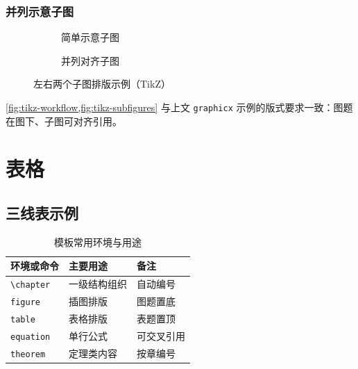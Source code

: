 \subsection{并列示意子图}
\begin{figure}[htbp]
  \centering
  \begin{subfigure}[b]{0.47\textwidth}
    \centering
    \caption{简单示意子图}
    \label{fig:tikz-sub-left}
  \end{subfigure}
  \hfill
  \begin{subfigure}[b]{0.47\textwidth}
    \centering
    \caption{并列对齐子图}
    \label{fig:tikz-sub-right}
  \end{subfigure}
  \caption{左右两个子图排版示例（TikZ）}
  \label{fig:tikz-subfigures}
\end{figure}

\cref{fig:tikz-workflow,fig:tikz-subfigures} 与上文 \texttt{graphicx} 示例的版式要求一致：图题在图下、子图可对齐引用。

\chapter{表格}\label{ch:tables}

\section{三线表示例}
\begin{table}[htbp]
  \centering
  \caption{模板常用环境与用途}
  \label{tab:booktabs}
  \begin{tabular}{lll}
    \toprule
    环境或命令 & 主要用途 & 备注 \\
    \midrule
    \texttt{\textbackslash chapter} & 一级结构组织 & 自动编号 \\
    \texttt{figure} & 插图排版 & 图题置底 \\
    \texttt{table} & 表格排版 & 表题置顶 \\
    \texttt{equation} & 单行公式 & 可交叉引用 \\
    \texttt{theorem} & 定理类内容 & 按章编号 \\
    \bottomrule
  \end{tabular}
\end{table}

